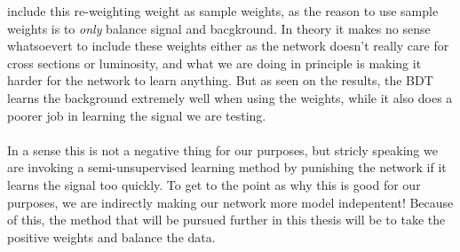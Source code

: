 \documentclass[14pt, a4paper]{book}
\begin{document}
include this re-weighting weight as sample weights, as the reason to use sample weights is to \textit{only} balance signal and bacgkround. In theory it makes no sense whatsoevert to include these weights either 
as the network doesn't really care for cross sections or luminosity, and what we are doing in principle is making it harder for the network to learn anything. But as seen on the results, the BDT learns the background 
extremely well when using the weights, while it also does a poorer job in learning the signal we are testing.\\ 
\\In a sense this is not a negative thing for our purposes, but stricly speaking we are invoking a semi-unsupervised learning method by punishing the network if it learns the signal too quickly. 
To get to the point as why this is good for our purposes, we are indirectly making our network more model indepentent! Because of this, the method that will be pursued further in this thesis will be to 
take the positive weights and balance the data.
\end{document}
